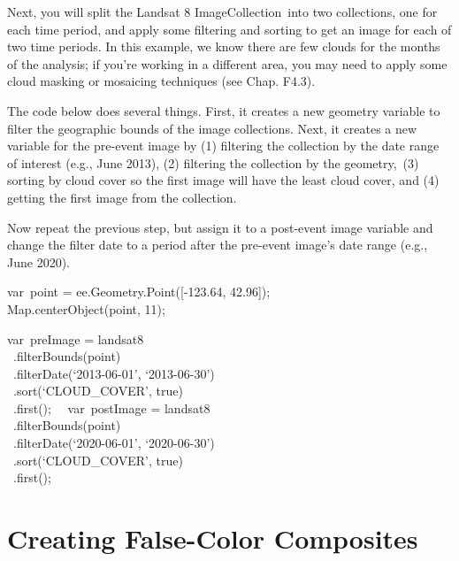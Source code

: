 \documentclass[
  letterpaper,
  DIV=11,
  numbers=noendperiod]{scrreprt}
\begin{document}
Next, you will split the Landsat 8 ImageCollection~into two collections,
one for each time period, and apply some filtering and sorting to get an
image for each of two time periods. In this example, we know there are
few clouds for the months of the analysis; if you're working in a
different area, you may need to apply some cloud masking or mosaicing
techniques (see Chap. F4.3).

The code below does several things. First, it creates a new geometry
variable to filter the geographic bounds of the image collections. Next,
it creates a new variable for the pre-event image by (1) filtering the
collection by the date range of interest (e.g., June 2013), (2)
filtering the collection by the geometry,~(3) sorting by cloud cover so
the first image will have the least cloud cover, and (4) getting the
first image from the collection.

Now repeat the previous step, but assign it to a post-event image
variable and change the filter date to a period after the pre-event
image's date range (e.g., June 2020). ~

var~point = ee.Geometry.Point({[}-123.64, 42.96{]});\\
Map.centerObject(point, 11);

var~preImage = landsat8\\
\hspace*{0.333em} ~.filterBounds(point)\\
\hspace*{0.333em} ~.filterDate(`2013-06-01', `2013-06-30')\\
\hspace*{0.333em} ~.sort(`CLOUD\_COVER', true)\\
\hspace*{0.333em} ~.first();~ ~var~postImage = landsat8\\
\hspace*{0.333em} ~.filterBounds(point)\\
\hspace*{0.333em} ~.filterDate(`2020-06-01', `2020-06-30')\\
\hspace*{0.333em} ~.sort(`CLOUD\_COVER', true)\\
\hspace*{0.333em} ~.first();

\hypertarget{creating-false-color-composites}{%
\section{Creating False-Color
Composites}\label{creating-false-color-composites}}
\end{document}
